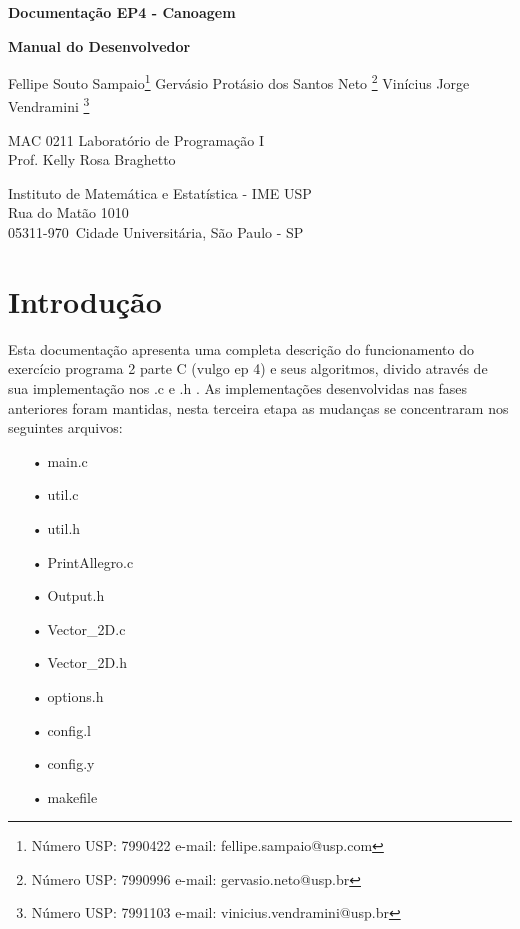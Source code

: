 \documentclass[a4paper,11pt]{article}
\begin{document}
\begin{center}{\Large \bf Documenta\c{c}ão EP4 - Canoagem \\ }\end{center}
\begin{center}{\Large \bf Manual do Desenvolvedor\\ }\end{center}

\begin{center}
{
Fellipe Souto Sampaio\footnote{Número USP: 7990422 e-mail: fellipe.sampaio@usp.com}
Gervásio Protásio dos Santos Neto \footnote{Número USP: 7990996 e-mail: gervasio.neto@usp.br}
Vinícius Jorge Vendramini \footnote{Número USP: 7991103 e-mail: vinicius.vendramini@usp.br}
}

\end{center}

\begin{center}
MAC 0211 Laboratório de Programa\c{c}ão I \\
Prof. Kelly Rosa Braghetto \\
             
\end{center}

\begin{center}
Instituto de Matemática e Estatística - IME USP \\
 Rua do Matão 1010 \\
 05311-970\, Cidade Universitária, São Paulo - SP \\
\end{center}

\newpage

\section{Introdu\c{c}ão}
Esta documenta\c{c}ão apresenta uma completa descri\c{c}ão do funcionamento do exercício programa 2 parte C (vulgo ep 4) e seus algoritmos, divido através de sua implementa\c{c}ão nos .c e .h . As implementa\c{c}ões desenvolvidas nas fases anteriores foram mantidas, nesta terceira etapa as mudan\c{c}as se concentraram nos seguintes arquivos:

\begin{enumerate}
\item[•]{main.c}
\item[•]{util.c}
\item[•]{util.h}
\item[•]{PrintAllegro.c}
\item[•]{Output.h}
\item[•]{Vector\_2D.c}
\item[•]{Vector\_2D.h}
\item[•]{options.h}
\item[•]{config.l}
\item[•]{config.y}
\item[•]{makefile}
\end{enumerate}
\end{document}
